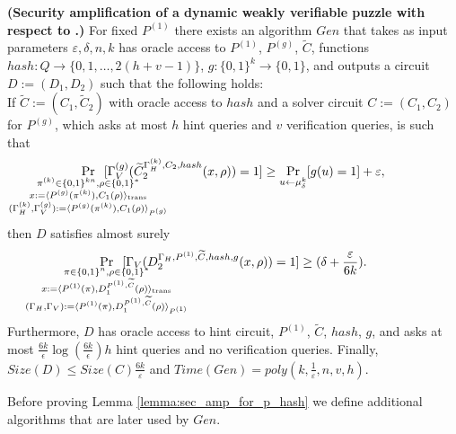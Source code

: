 %
%
\begin{lemma}\textbf{(Security amplification of a dynamic weakly verifiable puzzle with respect to .)}
  \label{lemma:sec_amp_for_p_hash}
  For fixed $P^{(1)}$ there exists an algorithm $Gen$ that takes as input parameters $\varepsilon, \delta, n, k$
  has oracle access to $P^{(1)}$, $P^{(g)}$, $\widetilde{C}$, functions $hash : Q \rightarrow \{0,1,\dots, 2(h+v-1)\}$, $g: \{0,1\}^{k} \rightarrow \{0,1\}$,
  and outputs a circuit $D := (D_1, D_2)$ such that the following holds: \\
  If $\widetilde{C} := (C_1, \widetilde{C}_2)$ with oracle access to $hash$ and a solver circuit $C := (C_1, C_2)$ for $P^{(g)}$,
  which asks at most $h$ hint queries and $v$ verification queries, is such that
  \begin{align*}
    \underset{\mathclap{\substack{
          \pi^{(k)} \in \{0,1\}^{kn}, \rho \in \{0,1\}^{*} \\
          x:= \langle P^{(g)}(\pi^{(k)}), {C}_1(\rho) \rangle_{\text{trans}} \\
          (\Gamma_H^{(k)}, \Gamma_V^{(g)}) := \langle P^{(g)}(\pi^{(k)}), C_1(\rho) \rangle_{P^{(g)}}}}}
    {\Pr}\mkern13mu[\Gamma_V^{(g)}(\widetilde{C}_2^{\Gamma_H^{(k)}, C_2, hash}(x,\rho)) = 1]
    \geq \underset{u \leftarrow \mu_\delta^k}{\Pr}[g(u) = 1] + \varepsilon,
  \end{align*}
  then $D$ satisfies almost surely
  \begin{align*}
    \underset{
      \mathclap{
      \substack{
        \pi \in \{0,1\}^{n}, \rho \in \{0,1\}^{*} \\
        x := \langle P^{(1)}(\pi), D_1^{P^{(1)}, \widetilde{C}}(\rho) \rangle_{\text{trans}} \\
        (\Gamma_H, \Gamma_V) := \langle P^{(1)}(\pi), D_1^{P^{(1)}, \widetilde{C}}(\rho) \rangle_{P^{(1)}}}}}
    {\Pr}\mkern13mu[\Gamma_V(D_2^{\Gamma_H, P^{(1)}, \widetilde{C}, hash, g}(x, \rho)) = 1] \geq (\delta + \frac{\varepsilon}{6k}).
  \end{align*}
  Furthermore, $D$ has oracle access to hint circuit, $P^{(1)}$, $\widetilde{C}$, $hash$, $g$, and
  asks at most $\frac{6k}{\epsilon}\log\left(\frac{6k}{\epsilon}\right) h$ hint queries and no verification queries.
  Finally, $Size(D) \leq Size(C)\frac{6k}{\varepsilon}$ and $Time(Gen) = poly(k, \frac{1}{\varepsilon}, n, v, h)$.
\end{lemma}
%
%
Before proving Lemma \ref{lemma:sec_amp_for_p_hash} we define additional algorithms that are later used by $Gen$.
